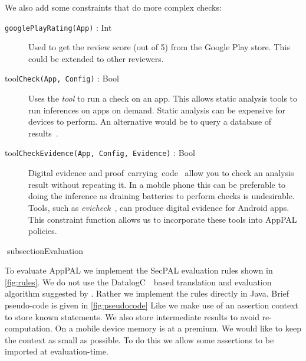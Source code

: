 \documentclass[a4paper]{scrartcl}
\begin{document}
We also add some constraints that do more complex checks:
\begin{description}
  \item[\texttt{googlePlayRating(App)} : Int]
    Used to get the review score (out of 5) from the Google Play store.
    This could be extended to other reviewers.

  \item[tool\texttt{Check(App, Config)} : Bool]
    Uses the \emph{tool} to run a check on an app.
    This allows static analysis tools to run inferences on apps on demand.
    Static analysis can be expensive for devices to perform.
    An alternative would be to query a database of results~\citep{Noel:2014vt}.

  \item[tool\texttt{CheckEvidence(App, Config, Evidence)} : Bool]
    Digital evidence and proof~carrying~code~\citep{Necula:1996tr,Stark:2009uc} allow you to check an analysis result without repeating it.
    In a mobile phone this can be preferable to doing the inference as draining batteries to perform checks is undesirable.
    Tools, such as \emph{evicheck}~\citep{Noel:2014vt}, can produce digital evidence for Android apps.
    This constraint function allows us to incorporate these tools into AppPAL policies.
\end{description}

subsection{Evaluation}

To evaluate AppPAL we implement the SecPAL evaluation rules shown in \autoref{fig:rules}.
We do not use the DatalogC~\citep{Li:2003ix}~based translation and evaluation algorithm suggested by \citeauthor{Becker:2006vh}.
Rather we implement the rules directly in Java. 
Brief pseudo-code is given in \autoref{fig:pseudocode}
Like \citeauthor{Becker:2006vh} we make use of an assertion context to store known statements.
We also store intermediate results to avoid re-computation.
On a mobile device memory is at a premium.
We would like to keep the context as small as possible.
To do this we allow some assertions to be imported at evaluation-time.
\end{document}
